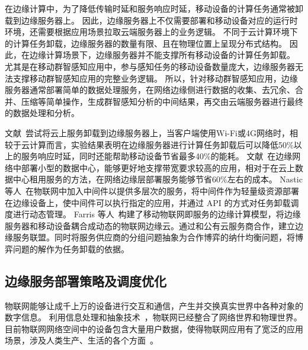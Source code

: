 在边缘计算中，为了降低传输时延和服务响应时延，移动设备的计算任务通常被卸载到边缘服务器上。
因此，边缘服务器上不仅需要部署和移动设备对应的运行时环境，还需要根据应用场景拉取云端服务器上的业务逻辑。
不同于云计算环境下的计算任务卸载，边缘服务器的数量有限、且在物理位置上呈现分布式结构。
因此，在边缘计算场景下，边缘服务器并不能支撑所有移动设备的计算任务卸载。
尤其是在移动群智感知应用中，参与感知任务的移动设备数量庞大，边缘服务器无法支撑移动群智感知应用的完整业务逻辑。
所以，针对移动群智感知应用，边缘服务器通常部署简单的数据处理服务，在网络边缘侧进行数据的收集、去冗余、合并、压缩等简单操作，生成群智感知分析的中间结果，再交由云端服务器进行最终的数据处理和分析。

文献~尝试将云上服务卸载到边缘服务器上，当客户端使用Wi-Fi或4G网络时，相较于云计算而言，实验结果表明在边缘服务器进行计算任务卸载后可以降低50\%以上的服务响应时延，同时还能帮助移动设备节省最多40\%的能耗。
文献~在边缘网络中部署小型的数据中心，能够更好地支撑带宽要求较高的应用，相对于在云上数据中心租用服务的方法，在网络边缘层部署服务能够节省60\%左右的成本。
Nastic等人~\cite{DBLP:conf/edge/NasticTD16}在物联网中加入中间件以提供多层次的服务，将中间件作为轻量级资源部署在边缘设备上，使中间件可以执行指定的应用，并通过 API 的方式对任务卸载调度进行动态管理。
Farris 等人~\cite{DBLP:journals/fgcs/FarrisMNAI17}构建了移动物联网即服务的边缘计算模型，将边缘服务器和移动设备耦合成动态的物联网边缘云。通过和公有云服务商合作，建立边缘服务联盟。同时将服务供应商的分组问题抽象为合作博弈的纳什均衡问题，将博弈问题的解作为任务卸载的依据。

\subsection{边缘服务部署策略及调度优化}

物联网能够让成千上万的设备进行交互和通信，产生并交换真实世界中各种对象的数字信息。
利用信息处理和抽象技术~\cite{DBLP:journals/iotj/GanzPBC15}，物联网已经整合了网络世界和物理世界。
目前物联网网络空间中的设备包含大量用户数据，使得物联网应用有了宽泛的应用场景，涉及人类生产、生活的各个方面~\cite{DBLP:journals/cm/WangYXJD17}。

